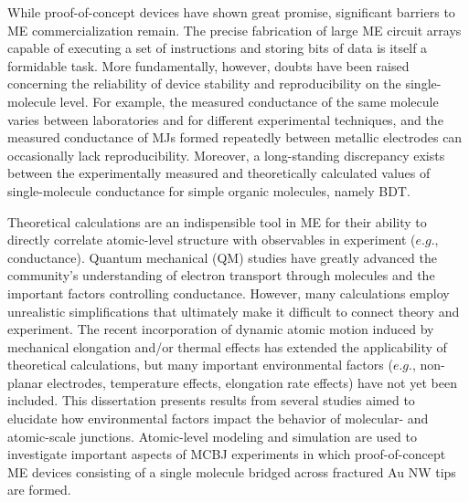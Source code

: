 \documentclass[10pt]{report}  %
\begin{document}
While proof-of-concept devices have shown great promise, significant barriers to ME commercialization remain. The precise fabrication of large ME circuit arrays \cite{Akkerman:2006,Bandyopadhyay:2010} capable of executing a set of instructions and storing bits of data is itself a formidable task. More fundamentally, however, doubts have been raised concerning the reliability of device stability\cite{Tsutsui:2008,Teramae:2008,Zhou:2010} and reproducibility\cite{Lindsay:2007} on the single-molecule level. For example, the measured conductance of the same molecule varies between laboratories and for different experimental techniques,\cite{Lindsay:2007,Haiss:2009} and the measured conductance of MJs formed repeatedly between metallic electrodes can occasionally lack reproducibility. \cite{Ulrich:2006,Venkataraman:2006} Moreover, a long-standing discrepancy exists between the experimentally measured and theoretically calculated values of single-molecule conductance for simple organic molecules, namely BDT.\cite{DiVentra:2000,Nitzan:2003,Lindsay:2007}

Theoretical calculations are an indispensible tool in ME for their ability to directly correlate atomic-level structure with observables in experiment ($e.g.$, conductance). Quantum mechanical (QM)  studies have greatly advanced the community's understanding of electron transport through molecules and the important factors controlling conductance.  However, many calculations \cite{DiVentra:2000,Emberly:2001,Basch:2005,Hu:2005,Pontes:2006,Sen:2010} employ unrealistic simplifications that ultimately make it difficult to connect theory and experiment. The recent incorporation of dynamic atomic motion induced by mechanical elongation \cite{Paulsson:2009,Strange:2010,Sergueev:2010,Pontes:2011} and/or thermal effects\cite{Andrews:2008,Cao:2008,Maul:2009,Kim:2010} has extended the applicability of theoretical calculations, but many important environmental factors ($e.g.$, non-planar electrodes, temperature effects, elongation rate effects) have not yet been included. This dissertation presents results from several studies \cite{French:2011,French:2012,French-macs:2013,French-fluctuations:2013,French-gpus:2013} aimed to elucidate how environmental factors impact the behavior of molecular- and atomic-scale junctions. Atomic-level modeling and simulation are used to investigate important aspects of MCBJ experiments in which proof-of-concept ME devices consisting of a single molecule bridged across fractured Au NW tips are formed.
\end{document}
